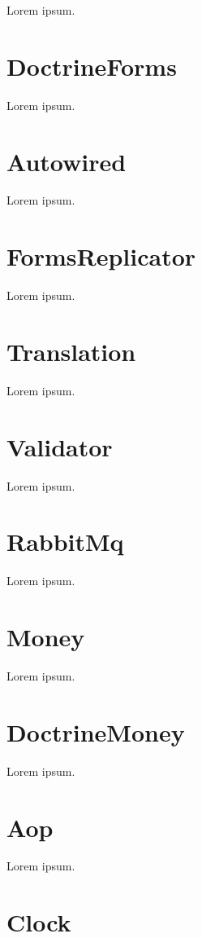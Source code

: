 Lorem ipsum.

\section{DoctrineForms}

Lorem ipsum.

\section{Autowired}

Lorem ipsum.

\section{FormsReplicator}

Lorem ipsum.

\section{Translation}

Lorem ipsum.

\section{Validator}

Lorem ipsum.

\section{RabbitMq}

Lorem ipsum.

\section{Money}

Lorem ipsum.

\section{DoctrineMoney}

Lorem ipsum.

\section{Aop}

Lorem ipsum.

\section{Clock}

